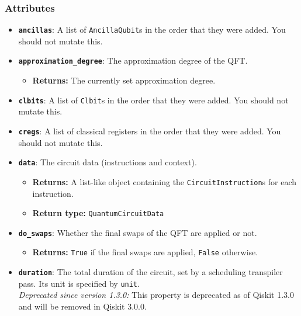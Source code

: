 \subsubsection{Attributes}
\begin{itemize}
    \item \textbf{\texttt{ancillas}}: A list of \texttt{AncillaQubit}s in the order that they were added. You should not mutate this.
    
    \item \textbf{\texttt{approximation\_degree}}: The approximation degree of the QFT.  
    \begin{itemize}
        \item \textbf{Returns:} The currently set approximation degree.
    \end{itemize}
    
    \item \textbf{\texttt{clbits}}: A list of \texttt{Clbit}s in the order that they were added. You should not mutate this.
    
    \item \textbf{\texttt{cregs}}: A list of classical registers in the order that they were added. You should not mutate this.
    
    \item \textbf{\texttt{data}}: The circuit data (instructions and context).  
    \begin{itemize}
        \item \textbf{Returns:} A list-like object containing the \texttt{CircuitInstruction}s for each instruction.
        \item \textbf{Return type:} \texttt{QuantumCircuitData}
    \end{itemize}
    
    \item \textbf{\texttt{do\_swaps}}: Whether the final swaps of the QFT are applied or not.  
    \begin{itemize}
        \item \textbf{Returns:} \texttt{True} if the final swaps are applied, \texttt{False} otherwise.
    \end{itemize}

    \item \textbf{\texttt{duration}}: The total duration of the circuit, set by a scheduling transpiler pass. Its unit is specified by \texttt{unit}.\\
    \textit{Deprecated since version 1.3.0:} This property is deprecated as of Qiskit 1.3.0 and will be removed in Qiskit 3.0.0.


\end{itemize}
